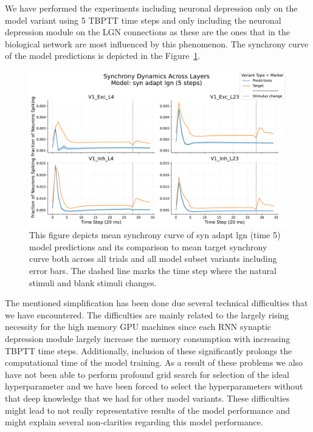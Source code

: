 We have performed the experiments including neuronal depression only on the model variant using 5 TBPTT time steps and only including the neuronal depression module on the LGN connections as these are the ones that in the biological network are most influenced by this phenomenon. The synchrony curve of the model predictions is depicted in the Figure~\ref{fig:synchrony_curve_syn_adapt_lgn_5}. 

\begin{figure}
    \centering
    \includegraphics[width=\linewidth]{img/plots/separate_model_synchrony_curve_syn_only_lgn_5_evaluation.pdf}
    \caption{This figure depicts mean synchrony curve of syn adapt lgn (time 5) model predictions and its comparison to mean target synchrony curve both across all trials and all model subset variants including error bars. The dashed line marks the time step where the natural stimuli and blank stimuli changes.}
    \label{fig:synchrony_curve_syn_adapt_lgn_5}
\end{figure}

The mentioned simplification has been done due several technical difficulties that we have encountered. The difficulties are mainly related to the largely rising necessity for the high memory GPU machines since each RNN synaptic depression module largely increase the memory consumption with increasing TBPTT time steps. Additionally, inclusion of these significantly prolongs the computational time of the model training. As a result of these problems we also have not been able to perform profound grid search for selection of the ideal hyperparameter and we have been forced to select the hyperparameters without that deep knowledge that we had for other model variants. These difficulties might lead to not really representative results of the model performance and might explain several non-clarities regarding this model performance.

